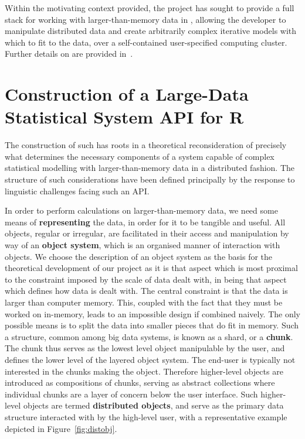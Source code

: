 \documentclass[letterpaper, inpress]{jds} %
\begin{document}
Within the motivating context provided, the  project has sought to provide a full stack for working with larger-than-memory data in , allowing the developer to manipulate distributed data and create arbitrarily complex iterative models with which to fit to the data, over a self-contained user-specified computing cluster. Further details on  are provided in~\citet{cairns2023}.

\section{Construction of a Large-Data Statistical System API for R}

The construction of such  has roots in a theoretical reconsideration of precisely what determines the necessary components of a system capable of complex statistical modelling with larger-than-memory data in a distributed fashion.
The structure of such considerations have been defined principally by the response to linguistic challenges facing such an API.

In order to perform calculations on larger-than-memory data, we need some means of \textbf{representing} the data, in order for it to be tangible and useful.
All objects, regular or irregular, are facilitated in their access and manipulation by way of an \textbf{object system}, which is an organised manner of interaction with objects.
We choose the description of an object system as the basis for the theoretical development of our project as it is that aspect which is most proximal to the constraint imposed by the scale of data dealt with, in being that aspect which defines how data is dealt with.
The central constraint is that the data is larger than computer memory.
This, coupled with the fact that they must be worked on in-memory, leads to an impossible design if combined naively.
The only possible means is to split the data into smaller pieces that do fit in memory.
Such a structure, common among big data systems, is known as a shard, or a \textbf{chunk}. 
The chunk thus serves as the lowest level object manipulable by the user, and defines the lower level of the layered object system.
The end-user is typically not interested in the chunks making the object.
Therefore higher-level objects are introduced as compositions of chunks, serving as abstract collections where individual chunks are a layer of concern below the user interface.
Such higher-level objects are termed \textbf{distributed objects}, and serve as the primary data structure interacted with by the high-level user, with a representative example depicted in Figure~\ref{fig:distobj}.
\end{document}
